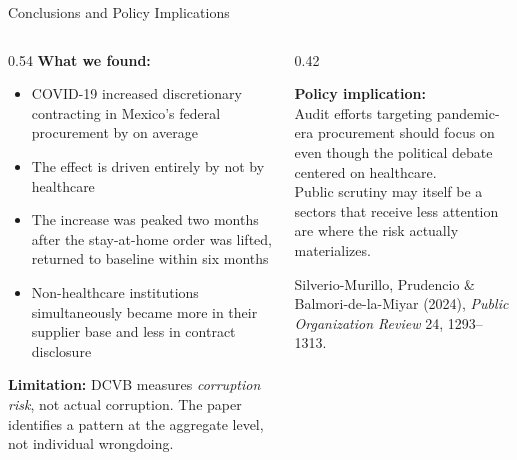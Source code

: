 \documentclass[aspectratio=169, 10pt]{beamer}
\begin{document}
\begin{frame}{Conclusions and Policy Implications}
  \begin{columns}
    \begin{column}{0.54\textwidth}
      \textbf{What we found:}
      \begin{itemize}
        \item COVID-19 increased discretionary contracting in Mexico's
              federal procurement by  on average
        \item The effect is driven entirely by
              not by healthcare
        \item The increase was  peaked two months after
              the stay-at-home order was lifted, returned to baseline
              within six months
        \item Non-healthcare institutions simultaneously became more
               in their supplier base and less
               in contract disclosure
      \end{itemize}

      \vspace{0.2em}
      {\small \textbf{Limitation:} DCVB measures \emph{corruption risk},
      not actual corruption. The paper identifies a pattern at the
      aggregate level, not individual wrongdoing.}
    \end{column}
    \begin{column}{0.42\textwidth}
      \begin{resultbox}
        \textbf{Policy implication:}\\[0.5em]
        Audit efforts targeting pandemic-era procurement should focus on
         even though the political
        debate centered on healthcare.\\[0.5em]
        Public scrutiny may itself be a 
        sectors that receive less attention are where the risk
        actually materializes.
      \end{resultbox}

      \vspace{0.2em}
      {\small \color{medgray}
        Silverio-Murillo, Prudencio \& Balmori-de-la-Miyar (2024),
        \textit{Public Organization Review} 24, 1293--1313.}
    \end{column}
  \end{columns}
\end{frame}
\end{document}
